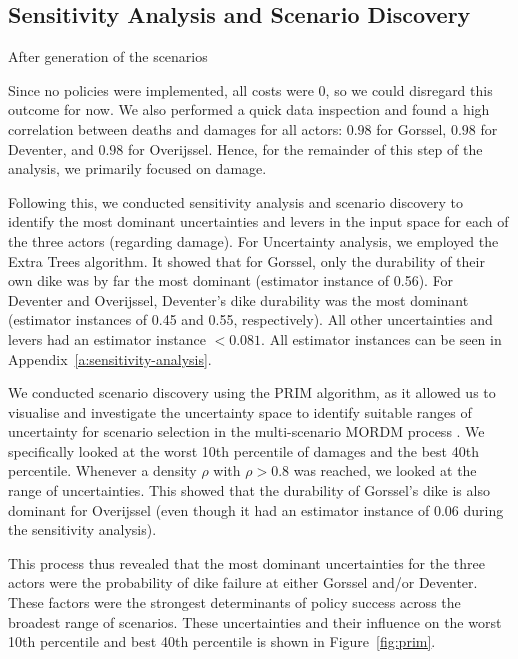\subsection{Sensitivity Analysis and Scenario Discovery}
After generation of the scenarios

Since no policies were implemented, all costs were 0, so we could disregard this outcome for now. We also performed a quick data inspection and found a high correlation between deaths and damages for all actors: $0.98$ for Gorssel, $0.98$ for Deventer, and $0.98$ for Overijssel. Hence, for the remainder of this step of the analysis, we primarily focused on damage.

Following this, we conducted sensitivity analysis and scenario discovery to identify the most dominant uncertainties and levers in the input space for each of the three actors (regarding damage). For Uncertainty analysis, we employed the Extra Trees algorithm. It showed that for Gorssel, only the durability of their own dike was by far the most dominant (estimator instance of 0.56). For Deventer and Overijssel, Deventer's dike durability was the most dominant (estimator instances of 0.45 and 0.55, respectively). All other uncertainties and levers had an estimator instance $<0.081$. All estimator instances can be seen in Appendix~\ref{a:sensitivity-analysis}.

We conducted scenario discovery using the PRIM algorithm, as it allowed us to visualise and investigate the uncertainty space to identify suitable ranges of uncertainty for scenario selection in the multi-scenario MORDM process \parencite{bryant_thinking_2010}. We specifically looked at the worst 10th percentile of damages and the best 40th percentile. Whenever a density $\rho$ with $\rho>0.8$ was reached, we looked at the range of uncertainties. This showed that the durability of Gorssel's dike is also dominant for Overijssel (even though it had an estimator instance of 0.06 during the sensitivity analysis).

This process thus revealed that the most dominant uncertainties for the three actors were the probability of dike failure at either Gorssel and/or Deventer. These factors were the strongest determinants of policy success across the broadest range of scenarios. These uncertainties and their influence on the worst 10th percentile and best 40th percentile is shown in Figure~\ref{fig:prim}.

